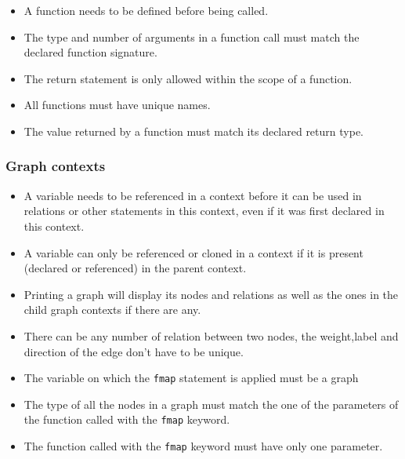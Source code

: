 \begin{itemize}
    \item A function needs to be defined before being called.
    \item The type and number of arguments in a function call must match the declared function signature.
    \item The return statement is only allowed within the scope of a function.
    \item All functions must have unique names.
    \item The value returned by a function must match its declared return type.
    \end{itemize}

\subsubsection{Graph contexts}

\begin{itemize}
    \item A variable needs to be referenced in a context before it can be used in relations or other statements in this context, even if it was first declared in this context.
\item A variable can only be referenced or cloned in a context if it is present (declared or referenced) in the parent context.
    \item Printing a graph will display its nodes and relations as well as the ones in the child graph contexts if there are any.
    \item There can be any number of relation between two nodes, the weight,label and direction of the edge don't have to be unique.
    \item The variable on which the \texttt{fmap} statement is applied must be a graph
    \item The type of all the nodes in a graph must match the one of the parameters of the function called with the \texttt{fmap} keyword.
    \item The function called with the \texttt{fmap} keyword must have only one parameter.
    \end{itemize}


